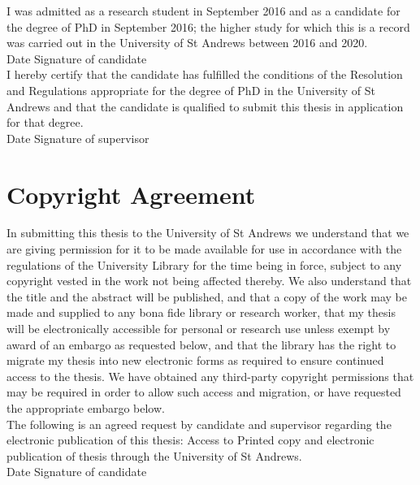 \documentclass[11pt]{book}
\begin{document}
I was admitted as a research student in September 2016 and as a candidate for the degree of PhD in September 2016; the higher study for which this is a record was carried out in the University of St Andrews between 2016 and 2020.\\

Date  \hspace{1.8in} Signature of candidate \\

I hereby certify that the candidate has fulfilled the conditions of the Resolution and Regulations appropriate for the degree of PhD in the University of St Andrews and that the candidate is qualified to submit this thesis in application for that degree.\\

Date  \hspace{1.8in} Signature of supervisor \\

\chapter{Copyright Agreement}

In submitting this thesis to the University of St Andrews we understand that we are giving permission for it to be made available for use in accordance with the regulations of the University Library for the time being in force, subject to any copyright vested in the work not being affected thereby. We also understand that the title and the abstract will be published, and that a copy of the work may be made and supplied to any bona fide library or research worker, that my thesis will be electronically accessible for personal or research use unless exempt by award of an embargo as requested below, and that the library has the right to migrate my thesis into new electronic forms as required to ensure continued access to the thesis. We have obtained any third-party copyright permissions that may be required in order to allow such access and migration, or have requested the appropriate embargo below.\\

The following is an agreed request by candidate and supervisor regarding the electronic publication of this thesis: Access to Printed copy and electronic publication of thesis through the University of St Andrews.\\

Date  \hspace{1.8in} Signature of candidate \\
\end{document}
